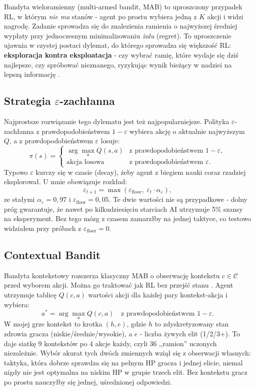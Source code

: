 Bandyta wieloramienny (multi-armed bandit, MAB) to uproszczony przypadek RL, w którym \emph{nie ma} stanów - agent po prostu wybiera jedną z $K$ akcji i widzi nagrodę. Zadanie sprowadza się do znalezienia ramienia o najwyższej średniej wypłaty przy jednoczesnym minimalizowaniu \emph{żalu} (regret). To uproszczenie ujawnia w czystej postaci dylemat, do którego sprowadza się większość RL: \textbf{eksploracja kontra eksploatacja} - czy wybrać ramię, które wydaje się dziś najlepsze, czy spróbować nieznanego, ryzykując wynik bieżący w nadziei na lepszą informację \cite{sutton2018rl}.

\subsection{Strategia $\varepsilon$-zachłanna}

Najprostsze rozwiązanie tego dylematu jest też najpopularniejsze. Polityka $\varepsilon$-zachłanna z prawdopodobieństwem $1-\varepsilon$ wybiera akcję o aktualnie najwyższym $Q$, a z prawdopodobieństwem $\varepsilon$ losuje:
\[
    \pi(s) = \begin{cases}
        \arg\max_{a} Q(s, a) & \text{z prawdopodobieństwem } 1-\varepsilon,\\
        \text{akcja losowa}  & \text{z prawdopodobieństwem } \varepsilon.
    \end{cases}
\]
Typowo $\varepsilon$ kurczy się w czasie (decay), żeby agent z biegiem nauki coraz rzadziej eksplorował. U mnie obowiązuje rozkład:
\[
    \varepsilon_{t+1} = \max(\varepsilon_\text{floor}, \; \varepsilon_t \cdot \alpha_\varepsilon),
\]
ze stałymi $\alpha_\varepsilon = 0{,}97$ i $\varepsilon_\text{floor} = 0{,}05$. Te dwie wartości nie są przypadkowe - dolny próg gwarantuje, że nawet po kilkudziesięciu starciach AI utrzymuje 5\% szansy na eksperyment. Bez tego mózg z czasem zamarzłby na jednej taktyce, co testowo widziałem przy próbach z $\varepsilon_\text{floor} = 0$.

\subsection{Contextual Bandit}

Bandyta kontekstowy rozszerza klasyczny MAB o obserwację kontekstu $c \in \mathcal{C}$ przed wyborem akcji. Można go traktować jak RL bez przejść stanu \cite{sutton2018rl}. Agent utrzymuje tablicę $Q(c, a)$ wartości akcji dla każdej pary kontekst-akcja i wybiera:
\[
    a^* = \arg\max_{a} Q(c, a) \quad \text{z prawdopodobieństwem } 1-\varepsilon.
\]
W mojej grze kontekst to krotka $(h, e)$, gdzie $h$ to zdyskretyzowany stan zdrowia gracza (niskie/średnie/wysokie), a $e$ - liczba żywych elit (1/2/3+). To daje siatkę 9 kontekstów po 4 akcje każdy, czyli 36 ,,ramion'' uczonych niezależnie. Wybór akurat tych dwóch zmiennych wziął się z obserwacji własnych: taktyka, która dobrze sprawdza się na pełnym HP gracza i jednej elicie, niemal nigdy nie jest optymalna na niskim HP w grupie trzech elit. Bez kontekstu gracz po prostu nauczyłby się jednej, uśrednionej odpowiedzi.

